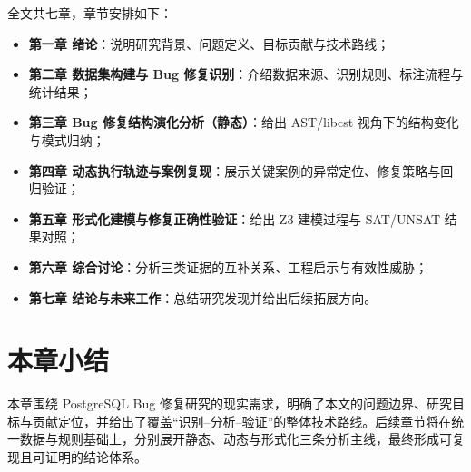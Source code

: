 全文共七章，章节安排如下：
\begin{itemize}
  \item \textbf{第一章 绪论}：说明研究背景、问题定义、目标贡献与技术路线；
  \item \textbf{第二章 数据集构建与 Bug 修复识别}：介绍数据来源、识别规则、标注流程与统计结果；
  \item \textbf{第三章 Bug 修复结构演化分析（静态）}：给出 AST/libcst 视角下的结构变化与模式归纳；
  \item \textbf{第四章 动态执行轨迹与案例复现}：展示关键案例的异常定位、修复策略与回归验证；
  \item \textbf{第五章 形式化建模与修复正确性验证}：给出 Z3 建模过程与 SAT/UNSAT 结果对照；
  \item \textbf{第六章 综合讨论}：分析三类证据的互补关系、工程启示与有效性威胁；
  \item \textbf{第七章 结论与未来工作}：总结研究发现并给出后续拓展方向。
\end{itemize}

\section{本章小结}

本章围绕 PostgreSQL Bug 修复研究的现实需求，明确了本文的问题边界、研究目标与贡献定位，并给出了覆盖“识别--分析--验证”的整体技术路线。后续章节将在统一数据与规则基础上，分别展开静态、动态与形式化三条分析主线，最终形成可复现且可证明的结论体系。
